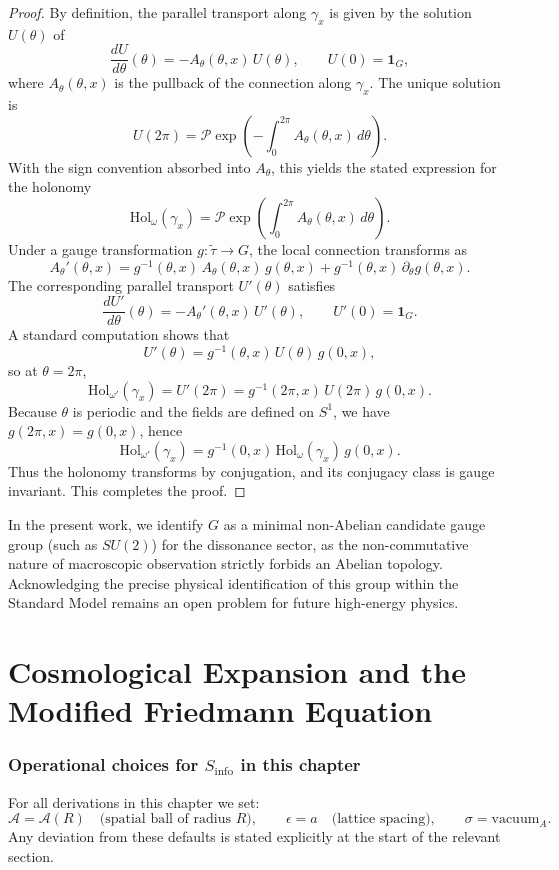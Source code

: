 \documentclass[12pt,openany]{book}
\theoremstyle{plain}
\theoremstyle{definition}
\theoremstyle{remark}
\begin{document}
\begin{proof}
By definition, the parallel transport along $\gamma_x$ is given by the
solution $U(\theta)$ of
\[
\frac{dU}{d\theta}(\theta)
= - A_\theta(\theta,x)\, U(\theta),
\qquad
U(0) = \mathbf{1}_G,
\]
where $A_\theta(\theta,x)$ is the pullback of the connection along
$\gamma_x$. The unique solution is
\[
U(2\pi)
= \mathcal{P} \exp\!\left(
    -\int_0^{2\pi} A_\theta(\theta,x)\, d\theta
  \right).
\]
With the sign convention absorbed into $A_\theta$, this yields the stated
expression for the holonomy
\[
\mathrm{Hol}_\omega(\gamma_x)
= \mathcal{P} \exp\!\left(
    \int_0^{2\pi} A_\theta(\theta,x)\, d\theta
  \right).
\]
Under a gauge transformation $g : \tilde{\tau} \to G$, the local connection
transforms as
\[
A_\theta'(\theta,x)
= g^{-1}(\theta,x)\, A_\theta(\theta,x)\, g(\theta,x)
  + g^{-1}(\theta,x)\, \partial_\theta g(\theta,x).
\]
The corresponding parallel transport $U'(\theta)$ satisfies
\[
\frac{dU'}{d\theta}(\theta)
= - A_\theta'(\theta,x)\, U'(\theta),
\qquad
U'(0) = \mathbf{1}_G.
\]
A standard computation shows that
\[
U'(\theta)
= g^{-1}(\theta,x)\, U(\theta)\, g(0,x),
\]
so at $\theta = 2\pi$,
\[
\mathrm{Hol}_{\omega'}(\gamma_x)
= U'(2\pi)
= g^{-1}(2\pi,x)\, U(2\pi)\, g(0,x).
\]
Because $\theta$ is periodic and the fields are defined on $S^1$, we have
$g(2\pi,x) = g(0,x)$, hence
\[
\mathrm{Hol}_{\omega'}(\gamma_x)
= g^{-1}(0,x)\, \mathrm{Hol}_\omega(\gamma_x)\, g(0,x).
\]
Thus the holonomy transforms by conjugation, and its conjugacy class is
gauge invariant. This completes the proof.
\end{proof}

In the present work, we identify $G$ as a minimal non-Abelian candidate gauge group (such as $SU(2)$) for the dissonance sector, as the non-commutative nature of macroscopic observation strictly forbids an Abelian topology. Acknowledging the precise physical identification of this group within the Standard Model remains an open problem for future high-energy physics.

\chapter{Cosmological Expansion and the Modified Friedmann Equation}

\subsection*{Operational choices for $S_{\mathrm{info}}$ in this chapter}
For all derivations in this chapter we set:
\[
\mathcal{A}=\mathcal{A}(R)\quad\text{(spatial ball of radius $R$)},\qquad
\epsilon=a\quad\text{(lattice spacing)},\qquad
\sigma=\text{vacuum}_A.
\]
Any deviation from these defaults is stated explicitly at the start of the relevant section.
\end{document}
